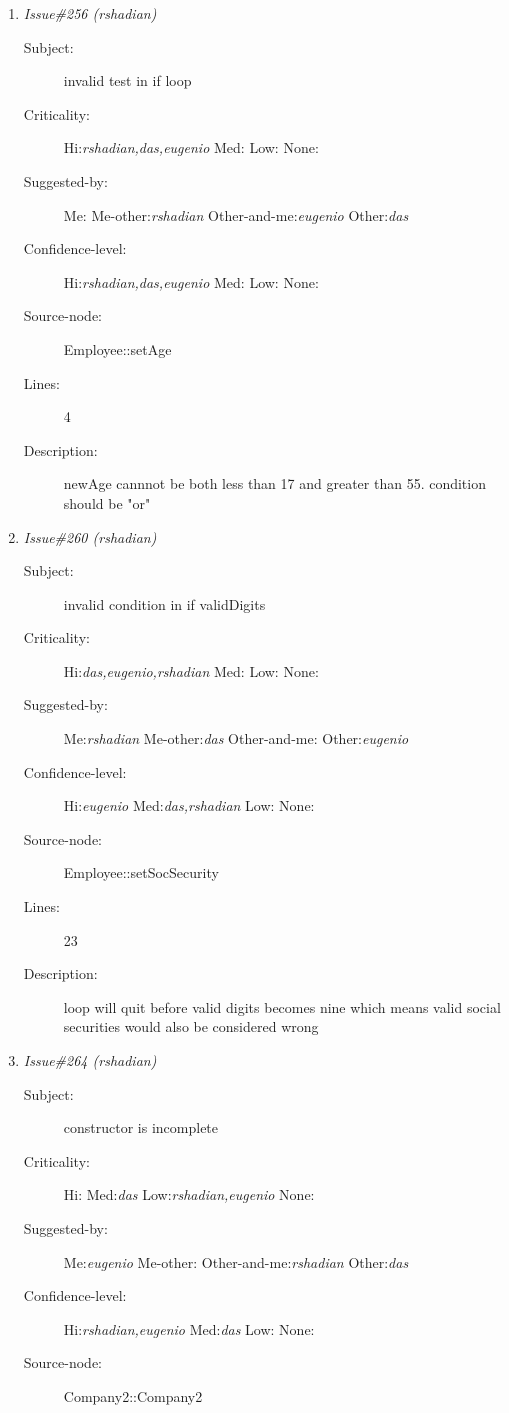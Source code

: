 \begin{enumerate}
\begin{description}
\item [Lines:] 11

\item [Description:] loop exits when null terminator is reached but
does not copy the null into the Soc Sec string
\end{description}
\item {\it Issue\#256 (rshadian)}
\begin{description}
\item [Subject:] invalid test in if loop
\item [Criticality:] Hi:{\it rshadian,das,eugenio} Med:{\it } Low:{\it } None:{\it }
\item [Suggested-by:] Me:{\it } Me-other:{\it rshadian} Other-and-me:{\it eugenio} Other:{\it das}
\item [Confidence-level:] Hi:{\it rshadian,das,eugenio} Med:{\it } Low:{\it } None:{\it }
\item [Source-node:] Employee::setAge

\item [Lines:] 4

\item [Description:] newAge cannnot be both less than 17 and
greater than 55.  condition should be "or"
\end{description}
\item {\it Issue\#260 (rshadian)}
\begin{description}
\item [Subject:] invalid condition in if validDigits
\item [Criticality:] Hi:{\it das,eugenio,rshadian} Med:{\it } Low:{\it } None:{\it }
\item [Suggested-by:] Me:{\it rshadian} Me-other:{\it das} Other-and-me:{\it } Other:{\it eugenio}
\item [Confidence-level:] Hi:{\it eugenio} Med:{\it das,rshadian} Low:{\it } None:{\it }
\item [Source-node:] Employee::setSocSecurity

\item [Lines:] 23

\item [Description:] loop will quit before valid digits becomes
nine which means valid social securities would also be considered wrong
\end{description}
\item {\it Issue\#264 (rshadian)}
\begin{description}
\item [Subject:] constructor is incomplete
\item [Criticality:] Hi:{\it } Med:{\it das} Low:{\it rshadian,eugenio} None:{\it }
\item [Suggested-by:] Me:{\it eugenio} Me-other:{\it } Other-and-me:{\it rshadian} Other:{\it das}
\item [Confidence-level:] Hi:{\it rshadian,eugenio} Med:{\it das} Low:{\it } None:{\it }
\item [Source-node:] Company2::Company2


\end{description}
\end{enumerate}
